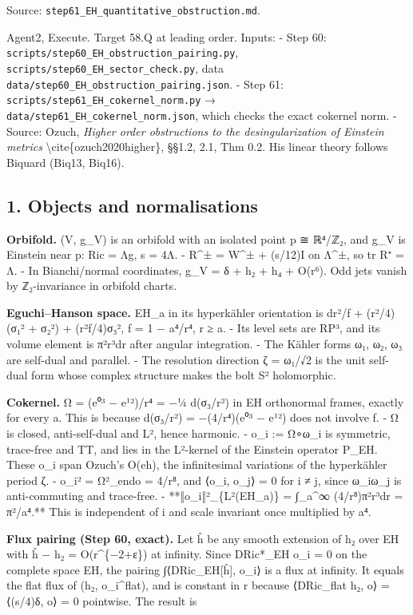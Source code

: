 \documentclass[
  10pt,
]{report}
\begin{document}
Source: \texttt{step61\_EH\_quantitative\_obstruction.md}.

Agent2, Execute. Target 58.Q at leading order. Inputs: - Step 60:
\texttt{scripts/step60\_EH\_obstruction\_pairing.py},
\texttt{scripts/step60\_EH\_sector\_check.py}, data
\texttt{data/step60\_EH\_obstruction\_pairing.json}. - Step 61:
\texttt{scripts/step61\_EH\_cokernel\_norm.py} →
\texttt{data/step61\_EH\_cokernel\_norm.json}, which checks the exact
cokernel norm. - Source: Ozuch, \emph{Higher order obstructions to the
desingularization of Einstein metrics}
\textbackslash cite\{ozuch2020higher\}, §§1.2, 2.1, Thm 0.2. His linear
theory follows Biquard (Biq13, Biq16).

\hypertarget{objects-and-normalisations}{%
\subsection{1. Objects and
normalisations}\label{objects-and-normalisations}}

\textbf{Orbifold.} (V, g\_V) is an orbifold with an isolated point p ≅
ℝ⁴/ℤ₂, and g\_V is Einstein near p: Ric = Λg, s = 4Λ. - R\^{}± = W\^{}±
+ (s/12)I on Λ\^{}±, so tr R⁺ = Λ. - In Bianchi/normal coordinates, g\_V
= δ + h₂ + h₄ + O(r⁶). Odd jets vanish by ℤ₂-invariance in orbifold
charts.

\textbf{Eguchi--Hanson space.} EH\_a in its hyperkähler orientation is
dr²/f + (r²/4)(σ₁² + σ₂²) + (r²f/4)σ₃², f = 1 − a⁴/r⁴, r ≥ a. - Its
level sets are RP³, and its volume element is π²r³dr after angular
integration. - The Kähler forms ω₁, ω₂, ω₃ are self-dual and parallel. -
The resolution direction ζ = ω₁/√2 is the unit self-dual form whose
complex structure makes the bolt S² holomorphic.

\textbf{Cokernel.} Ω = (e⁰³ − e¹²)/r⁴ = −¼ d(σ₃/r²) in EH orthonormal
frames, exactly for every a. This is because d(σ₃/r²) = −(4/r⁴)(e⁰³ −
e¹²) does not involve f. - Ω is closed, anti-self-dual and L², hence
harmonic. - o\_i := Ω∘ω\_i is symmetric, trace-free and TT, and lies in
the L²-kernel of the Einstein operator P\_EH. These o\_i span Ozuch's
O(eh), the infinitesimal variations of the hyperkähler period ζ. -
\textbar o\_i\textbar² = \textbar Ω\textbar²\_endo = 4/r⁸, and ⟨o\_i,
o\_j⟩ = 0 for i ≠ j, since ω\_iω\_j is anti-commuting and trace-free. -
**‖o\_i‖²\_\{L²(EH\_a)\} = ∫\_a\^{}∞ (4/r⁸)π²r³dr = π²/a⁴.** This is
independent of i and scale invariant once multiplied by a⁴.

\textbf{Flux pairing (Step 60, exact).} Let ĥ be any smooth extension of
h₂ over EH with ĥ − h₂ = O(r\^{}\{−2+ε\}) at infinity. Since DRic*\_EH
o\_i = 0 on the complete space EH, the pairing ∫⟨DRic\_EH{[}ĥ{]}, o\_i⟩
is a flux at infinity. It equals the flat flux of (h₂, o\_i\^{}flat),
and is constant in r because ⟨DRic\_flat h₂, o⟩ = ⟨(s/4)δ, o⟩ = 0
pointwise. The result is
\end{document}
